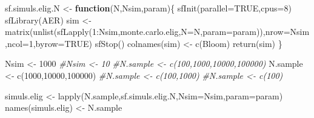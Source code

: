 \documentclass[
]{book}
\newenvironment{Shaded}{\begin{snugshade}}{\end{snugshade}}
\newcommand{\AttributeTok}[1]{\textcolor[rgb]{0.77,0.63,0.00}{#1}}
\newcommand{\CommentTok}[1]{\textcolor[rgb]{0.56,0.35,0.01}{\textit{#1}}}
\newcommand{\ConstantTok}[1]{\textcolor[rgb]{0.00,0.00,0.00}{#1}}
\newcommand{\ControlFlowTok}[1]{\textcolor[rgb]{0.13,0.29,0.53}{\textbf{#1}}}
\newcommand{\DecValTok}[1]{\textcolor[rgb]{0.00,0.00,0.81}{#1}}
\newcommand{\FunctionTok}[1]{\textcolor[rgb]{0.00,0.00,0.00}{#1}}
\newcommand{\NormalTok}[1]{#1}
\newcommand{\OtherTok}[1]{\textcolor[rgb]{0.56,0.35,0.01}{#1}}
\newcommand{\SpecialCharTok}[1]{\textcolor[rgb]{0.00,0.00,0.00}{#1}}
\newcommand{\StringTok}[1]{\textcolor[rgb]{0.31,0.60,0.02}{#1}}
\theoremstyle{definition}
\theoremstyle{definition}
\theoremstyle{definition}
\theoremstyle{definition}
\theoremstyle{remark}
\begin{document}
\begin{Shaded}
\begin{Highlighting}[]
\NormalTok{sf.simuls.elig.N }\OtherTok{\textless{}{-}} \ControlFlowTok{function}\NormalTok{(N,Nsim,param)\{}
  \FunctionTok{sfInit}\NormalTok{(}\AttributeTok{parallel=}\ConstantTok{TRUE}\NormalTok{,}\AttributeTok{cpus=}\DecValTok{8}\NormalTok{)}
  \FunctionTok{sfLibrary}\NormalTok{(AER)}
\NormalTok{  sim }\OtherTok{\textless{}{-}} \FunctionTok{matrix}\NormalTok{(}\FunctionTok{unlist}\NormalTok{(}\FunctionTok{sfLapply}\NormalTok{(}\DecValTok{1}\SpecialCharTok{:}\NormalTok{Nsim,monte.carlo.elig,}\AttributeTok{N=}\NormalTok{N,}\AttributeTok{param=}\NormalTok{param)),}\AttributeTok{nrow=}\NormalTok{Nsim,}\AttributeTok{ncol=}\DecValTok{1}\NormalTok{,}\AttributeTok{byrow=}\ConstantTok{TRUE}\NormalTok{)}
  \FunctionTok{sfStop}\NormalTok{()}
  \FunctionTok{colnames}\NormalTok{(sim) }\OtherTok{\textless{}{-}} \FunctionTok{c}\NormalTok{(}\StringTok{\textquotesingle{}Bloom\textquotesingle{}}\NormalTok{)}
  \FunctionTok{return}\NormalTok{(sim)}
\NormalTok{\}}

\NormalTok{Nsim }\OtherTok{\textless{}{-}} \DecValTok{1000}
\CommentTok{\#Nsim \textless{}{-} 10}
\CommentTok{\#N.sample \textless{}{-} c(100,1000,10000,100000)}
\NormalTok{N.sample }\OtherTok{\textless{}{-}} \FunctionTok{c}\NormalTok{(}\DecValTok{1000}\NormalTok{,}\DecValTok{10000}\NormalTok{,}\DecValTok{100000}\NormalTok{)}
\CommentTok{\#N.sample \textless{}{-} c(100,1000)}
\CommentTok{\#N.sample \textless{}{-} c(100)}

\NormalTok{simuls.elig }\OtherTok{\textless{}{-}} \FunctionTok{lapply}\NormalTok{(N.sample,sf.simuls.elig.N,}\AttributeTok{Nsim=}\NormalTok{Nsim,}\AttributeTok{param=}\NormalTok{param)}
\FunctionTok{names}\NormalTok{(simuls.elig) }\OtherTok{\textless{}{-}}\NormalTok{ N.sample}
\end{Highlighting}
\end{Shaded}
\end{document}
